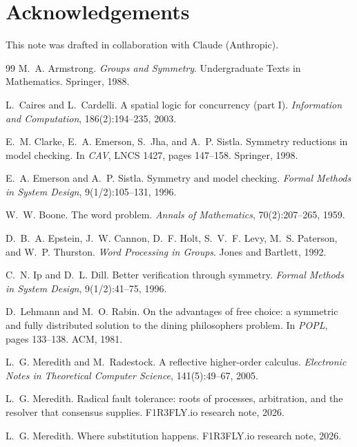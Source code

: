 \documentclass[11pt]{article}
\theoremstyle{definition}
\theoremstyle{remark}
\begin{document}
\section*{Acknowledgements}
This note was drafted in collaboration with Claude (Anthropic).

\begin{thebibliography}{99}
M.~A. Armstrong.
\newblock \emph{Groups and Symmetry}.
\newblock Undergraduate Texts in Mathematics. Springer, 1988.

L.~Caires and L.~Cardelli.
\newblock A spatial logic for concurrency (part {I}).
\newblock \emph{Information and Computation}, 186(2):194--235, 2003.

E.~M. Clarke, E.~A. Emerson, S.~Jha, and A.~P. Sistla.
\newblock Symmetry reductions in model checking.
\newblock In \emph{CAV}, LNCS 1427, pages 147--158. Springer, 1998.

E.~A. Emerson and A.~P. Sistla.
\newblock Symmetry and model checking.
\newblock \emph{Formal Methods in System Design}, 9(1/2):105--131, 1996.

W.~W. Boone.
\newblock The word problem.
\newblock \emph{Annals of Mathematics}, 70(2):207--265, 1959.

D.~B.~A. Epstein, J.~W. Cannon, D.~F. Holt, S.~V.~F. Levy, M.~S. Paterson, and
  W.~P. Thurston.
\newblock \emph{Word Processing in Groups}.
\newblock Jones and Bartlett, 1992.

C.~N. Ip and D.~L. Dill.
\newblock Better verification through symmetry.
\newblock \emph{Formal Methods in System Design}, 9(1/2):41--75, 1996.

D.~Lehmann and M.~O. Rabin.
\newblock On the advantages of free choice: a symmetric and fully distributed
  solution to the dining philosophers problem.
\newblock In \emph{POPL}, pages 133--138. ACM, 1981.

L.~G. Meredith and M.~Radestock.
\newblock A reflective higher-order calculus.
\newblock \emph{Electronic Notes in Theoretical Computer Science},
  141(5):49--67, 2005.

L.~G. Meredith.
\newblock Radical fault tolerance: roots of processes, arbitration, and the
  resolver that consensus supplies.
\newblock F1R3FLY.io research note, 2026.

L.~G. Meredith.
\newblock Where substitution happens.
\newblock F1R3FLY.io research note, 2026.


\end{thebibliography}
\end{document}

